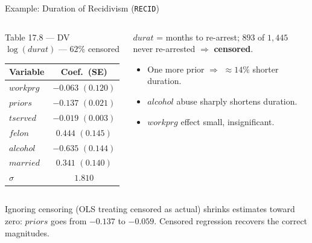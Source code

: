 \documentclass[aspectratio=169, 12pt]{beamer}
\begin{document}
\begin{frame}[shrink=10]{Example: Duration of Recidivism (\texttt{RECID})}

  \begin{columns}[t]
    \begin{examplebox}{Table 17.8 --- DV $\log(durat)$ --- $62\%$ censored}
      \centering\footnotesize
      \begin{tabular}{l c}
        \toprule
        Variable & Coef.\ (SE) \\
        \midrule
        $workprg$ & $-0.063$ $(0.120)$ \\
        $priors$  & $-0.137$ $(0.021)$ \\
        $tserved$ & $-0.019$ $(0.003)$ \\
        $felon$   & $0.444$ $(0.145)$ \\
        $alcohol$ & $-0.635$ $(0.144)$ \\
        $married$ & $0.341$ $(0.140)$ \\
        \midrule
        $\hat\sigma$ & $1.810$ \\
        \bottomrule
      \end{tabular}
    \end{examplebox}

    \begin{keybox}
      \small
      $durat$ = months to re-arrest; $893$ of $1{,}445$ never re-arrested
      $\Rightarrow$ \textbf{censored}.
      \begin{itemize}
        \item One more prior $\Rightarrow$ $\approx 14\%$ shorter duration.
        \item $alcohol$ abuse sharply shortens duration.
        \item $workprg$ effect small, insignificant.
      \end{itemize}
    \end{keybox}
  \end{columns}

  \smallskip

  \begin{highlightbox}
    \small
    Ignoring censoring (OLS treating censored as actual) shrinks estimates toward
    zero: $priors$ goes from $-0.137$ to $-0.059$. Censored regression recovers the
    correct magnitudes.
  \end{highlightbox}

\end{frame}
\end{document}
